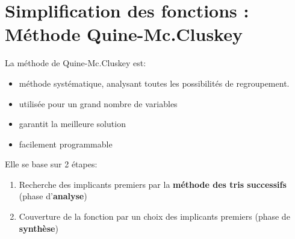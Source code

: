 \section{Simplification des fonctions : Méthode Quine-Mc.Cluskey}
La méthode de Quine-Mc.Cluskey est:
\begin{itemize}
	\item méthode systématique, analysant toutes les possibilités de regroupement. 
	\item utilisée pour un grand nombre de variables
	\item garantit la meilleure solution
	\item facilement programmable
\end{itemize}
Elle se base sur 2 étapes:
\begin{enumerate}
	\item Recherche des implicants premiers  par la \textbf{méthode des tris successifs} (phase d'\textbf{analyse})
	\item Couverture de la fonction  par un choix des implicants premiers (phase de \textbf{synthèse})
\end{enumerate}
